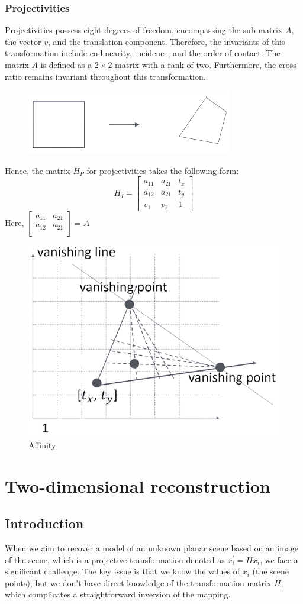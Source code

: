 \documentclass[12pt, a4paper]{report}
\begin{document}
    \subsection{Projectivities}
    Projectivities possess eight degrees of freedom, encompassing the sub-matrix $A$, the vector $v$, and the translation component. 
    Therefore, the invariants of this transformation include co-linearity, incidence, and the order of contact.
    The matrix $A$ is defined as a $2 \times 2$ matrix with a rank of two. 
    Furthermore, the cross ratio remains invariant throughout this transformation.
    \begin{figure}[H]
        \centering
        \includegraphics[width=0.25\linewidth]{images/projectivities.png}
    \end{figure}
    Hence, the matrix $H_P$ for projectivities takes the following form:
    \[H_I=
    \begin{bmatrix}
        a_{11} & a_{21} & t_x \\
        a_{12} & a_{21} & t_y \\
        v_1 & v_2 & 1
    \end{bmatrix}\]
    Here, $
    \begin{bmatrix}
        a_{11} & a_{21} \\
        a_{12} & a_{21} \\
    \end{bmatrix}
    =A$
    \begin{figure}[H]
        \centering
        \includegraphics[width=0.25\linewidth]{images/projectivities1.png}
        \caption{Affinity}
    \end{figure}

\newpage

\chapter{Two-dimensional reconstruction}
    \section{Introduction}
    When we aim to recover a model of an unknown planar scene based on an image of the scene, which is a projective transformation denoted as $x_i^{'}=Hx_i$, we face a significant challenge.
    The key issue is that we know the values of $x_i$ (the scene points), but we don't have direct knowledge of the transformation matrix $H$, which complicates a straightforward inversion of the mapping.
    
\end{document}
